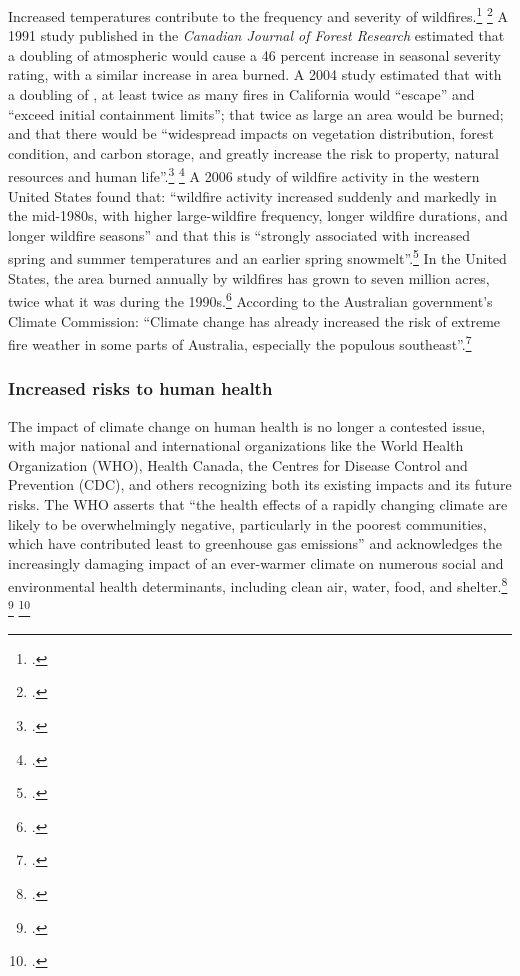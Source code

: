 \documentclass[10pt]{article}
\begin{document}
Increased temperatures contribute to the frequency and severity of wildfires.\footcite[][p. 33, 48, 50, 51, 53, 65 ]{IPCCar4_syr} \footcite[See also: ][]{UCSWildfire}
A 1991 study published in the \emph{Canadian Journal of Forest Research} estimated that a doubling of atmospheric  would cause a 46 percent increase in seasonal severity rating, with a similar increase in area burned.
A 2004 study estimated that with a doubling of , at least twice as many fires in California would ``escape'' and ``exceed initial containment limits''; that twice as large an area would be burned; and that there would be ``widespread impacts on vegetation distribution, forest condition, and carbon storage, and greatly increase the risk to property, natural resources and human life''.\footcite[][p. 169]{FriedWildfire} \footcite[See also: ][]{WesterlingWildfire}
A 2006 study of wildfire activity in the western United States found that: ``wildfire activity increased suddenly and markedly in the mid-1980s, with higher large-wildfire frequency, longer wildfire durations, and longer wildfire seasons'' and that this is ``strongly associated with increased spring and summer temperatures and an earlier spring snowmelt''.\footcite[][p. 940--943]{Westerling2006}
In the United States, the area burned annually by wildfires has grown to seven million acres, twice what it was during the 1990s.\footcite[][]{NYTFireNewNormal}
According to the Australian government's Climate Commission: ``Climate change has already increased the risk of extreme fire weather in some parts of Australia, especially the populous southeast''.\footcite[][p. 4]{CriticalDecade2013}



	\subsubsection{Increased risks to human health}



The impact of climate change on human health is no longer a contested issue, with major national and international organizations like the World Health Organization (WHO), Health Canada, the Centres for Disease Control and Prevention (CDC), and others recognizing both its existing impacts and its future risks. 
The WHO asserts that ``the health effects of a rapidly changing climate are likely to be overwhelmingly negative, particularly in the poorest communities, which have contributed least to greenhouse gas emissions'' and acknowledges the increasingly damaging impact of an ever-warmer climate on numerous social and environmental health determinants, including clean air, water, food, and shelter.\footcite[][]{WHOClimateHealth} \footcite[See also: ][]{LancetCCHealth} \footcite[See also: ][p. 811-7]{RacialEthnicHeat}
\end{document}
